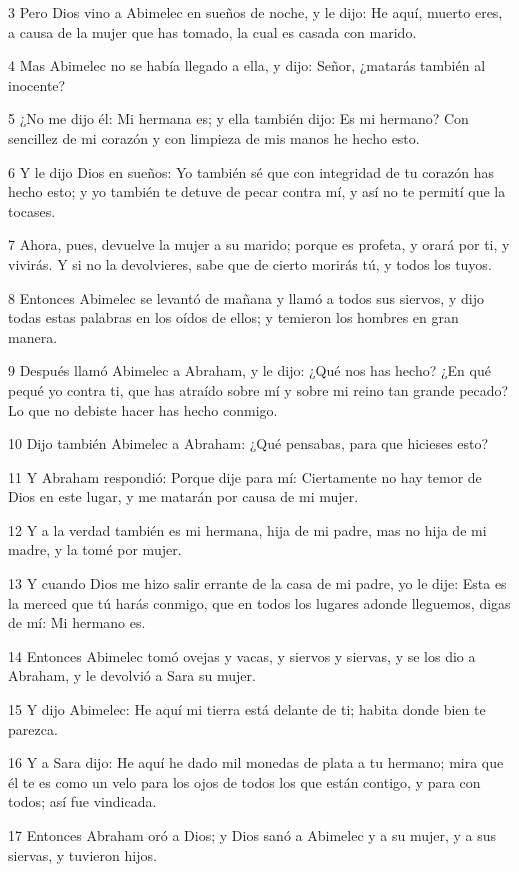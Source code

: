 3 Pero Dios vino a Abimelec en sueños de noche, y le dijo: He aquí, muerto eres, a causa de la mujer que has tomado, la cual es casada con marido.

4 Mas Abimelec no se había llegado a ella, y dijo: Señor, ¿matarás también al inocente?

5 ¿No me dijo él: Mi hermana es; y ella también dijo: Es mi hermano? Con sencillez de mi corazón y con limpieza de mis manos he hecho esto.

6 Y le dijo Dios en sueños: Yo también sé que con integridad de tu corazón has hecho esto; y yo también te detuve de pecar contra mí, y así no te permití que la tocases.

7 Ahora, pues, devuelve la mujer a su marido; porque es profeta, y orará por ti, y vivirás. Y si no la devolvieres, sabe que de cierto morirás tú, y todos los tuyos.

8 Entonces Abimelec se levantó de mañana y llamó a todos sus siervos, y dijo todas estas palabras en los oídos de ellos; y temieron los hombres en gran manera.

9 Después llamó Abimelec a Abraham, y le dijo: ¿Qué nos has hecho? ¿En qué pequé yo contra ti, que has atraído sobre mí y sobre mi reino tan grande pecado? Lo que no debiste hacer has hecho conmigo.

10 Dijo también Abimelec a Abraham: ¿Qué pensabas, para que hicieses esto?

11 Y Abraham respondió: Porque dije para mí: Ciertamente no hay temor de Dios en este lugar, y me matarán por causa de mi mujer.

12 Y a la verdad también es mi hermana, hija de mi padre, mas no hija de mi madre, y la tomé por mujer.

13 Y cuando Dios me hizo salir errante de la casa de mi padre, yo le dije: Esta es la merced que tú harás conmigo, que en todos los lugares adonde lleguemos, digas de mí: Mi hermano es.

14 Entonces Abimelec tomó ovejas y vacas, y siervos y siervas, y se los dio a Abraham, y le devolvió a Sara su mujer.

15 Y dijo Abimelec: He aquí mi tierra está delante de ti; habita donde bien te parezca.

16 Y a Sara dijo: He aquí he dado mil monedas de plata a tu hermano; mira que él te es como un velo para los ojos de todos los que están contigo, y para con todos; así fue vindicada.

17 Entonces Abraham oró a Dios; y Dios sanó a Abimelec y a su mujer, y a sus siervas, y tuvieron hijos.

